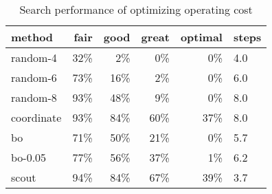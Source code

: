 \begin{table}[]
\centering
\scriptsize
\begin{tabular}{|l|r|r|r|r|l|}
\hline
method & fair               & good & great & optimal & steps \\ \hline
random-4   & 32\% & 2\%   & 0\%     & 0\%         & 4.0 \\ \hline
random-6   & 73\% & 16\%  & 2\%     & 0\%         & 6.0 \\ \hline
random-8   & 93\% & 48\%  & 9\%     & 0\%         & 8.0 \\ \hline
coordinate & 93\% & 84\%  & 60\%    & 37\%        & 8.0 \\ \hline
bo         & 71\% & 50\%  & 21\%    & 0\%         & 5.7 \\ \hline
bo-0.05    & 77\% & 56\%  & 37\%    & 1\%         & 6.2 \\ \hline
scout      & 94\% & 84\%  & 67\%    & 39\%        & 3.7 \\ \hline
\end{tabular}

\caption{Search performance of optimizing operating cost}
\label{tab:search_single_cost}
\end{table}